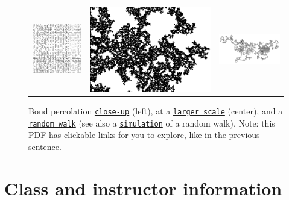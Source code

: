 \documentclass[oneside,11pt]{amsart}
\begin{document}
\begin{figure}[h]
	\begin{tabular}{ccc}
		\includegraphics[height=.32\textwidth]{img/Bond_percolation_p_51.png}
		&\hspace{10pt}\includegraphics[height=.32\textwidth]{img/Amas_de_percolation_gray.png}
		&\includegraphics[angle=90,height=.32\textwidth]{img/RW1.png}
	\end{tabular}
	\def\figurename{}
	\caption{Bond percolation
	\href{https://en.wikipedia.org/wiki/Percolation_theory}{\texttt{close-up}}
	(left),
	at a \href{https://commons.wikimedia.org/wiki/File:Amas_de_percolation.png}{\texttt{larger scale}} (center),
	and
	a 
	\href{https://en.wikipedia.org/wiki/Random_walk\#Lattice_random_walk}{\texttt{random walk}}
	(see also a
	\href{https://upload.wikimedia.org/wikipedia/commons/f/f3/Random_walk_2500_animated.svg}{\texttt{simulation}} 
	of a random walk).
	\tiny{Note:
	this PDF has clickable links for you to explore, like in the previous sentence.}
	}
\end{figure}

\section{Class and instructor information}
\end{document}
